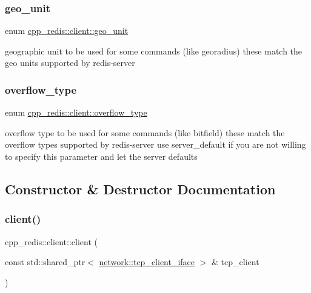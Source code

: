 \subsubsection{\texorpdfstring{geo\+\_\+unit}{geo\_unit}}
{\footnotesize\ttfamily enum \hyperlink{classcpp__redis_1_1client_aa5998536fd32ff4387c89be514997620}{cpp\+\_\+redis\+::client\+::geo\+\_\+unit}\hspace{0.3cm}{\ttfamily [strong]}}

geographic unit to be used for some commands (like georadius) these match the geo units supported by redis-\/server \mbox{\label{classcpp__redis_1_1client_a4119182ad3a01c1bb626a174375e114a}} 
\subsubsection{\texorpdfstring{overflow\+\_\+type}{overflow\_type}}
{\footnotesize\ttfamily enum \hyperlink{classcpp__redis_1_1client_a4119182ad3a01c1bb626a174375e114a}{cpp\+\_\+redis\+::client\+::overflow\+\_\+type}\hspace{0.3cm}{\ttfamily [strong]}}

overflow type to be used for some commands (like bitfield) these match the overflow types supported by redis-\/server use server\+\_\+default if you are not willing to specify this parameter and let the server defaults 

\subsection{Constructor \& Destructor Documentation}
\mbox{\label{classcpp__redis_1_1client_ae879c3a6829a2da9d03f80c1ec4b8d9b}} 
\subsubsection{\texorpdfstring{client()}{client()}}
{\footnotesize\ttfamily cpp\+\_\+redis\+::client\+::client (\begin{DoxyParamCaption}\item[{const std\+::shared\+\_\+ptr$<$ \hyperlink{classcpp__redis_1_1network_1_1tcp__client__iface}{network\+::tcp\+\_\+client\+\_\+iface} $>$ \&}]{tcp\+\_\+client }\end{DoxyParamCaption})\hspace{0.3cm}{\ttfamily [explicit]}}

